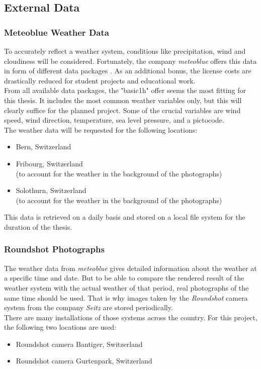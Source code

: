 \subsection{External Data}
\subsubsection{Meteoblue Weather Data}
To accurately reflect a weather system, conditions like precipitation, wind and cloudiness will be considered.
Fortunately, the company \emph{meteoblue} offers this data in form of different data packages \cite{meteoblue}.
As an additional bonus, the license costs are drastically reduced for student projects and educational work.
\\
From all available data packages, the "basic\textunderscore1h" \cite{meteoblue:basic1h} offer seems the most fitting for this thesis.
It includes the most common weather variables only, but this will clearly suffice for the planned project.
Some of the crucial variables are wind speed, wind direction, temperature, sea level pressure, and a pictocode.
\\
The weather data will be requested for the following locations:
\begin{itemize}
    \item Bern, Switzerland
    \item Fribourg, Switzerland \\(to account for the weather in the background of the photographs)
    \item Solothurn, Switzerland \\(to account for the weather in the background of the photographs)
\end{itemize}

\noindent
This data is retrieved on a daily basis and stored on a local file system for the duration of the thesis.

\subsubsection{Roundshot Photographs}
The weather data from \emph{meteoblue} gives detailed information about the weather at a specific time and date.
But to be able to compare the rendered result of the weather system with the actual weather of that period, real photographs of the same time should be used.
That is why images taken by the \emph{Roundshot} camera system from the company \emph{Seitz} \cite{roundshot} are stored periodically.
\\
There are many installations of those systems across the country. For this project, the following two locations are used: 
\begin{itemize}
    \item Roundshot camera Bantiger, Switzerland \cite{bantiger}
    \item Roundshot camera Gurtenpark, Switzerland \cite{gurtenpark}
\end{itemize}

